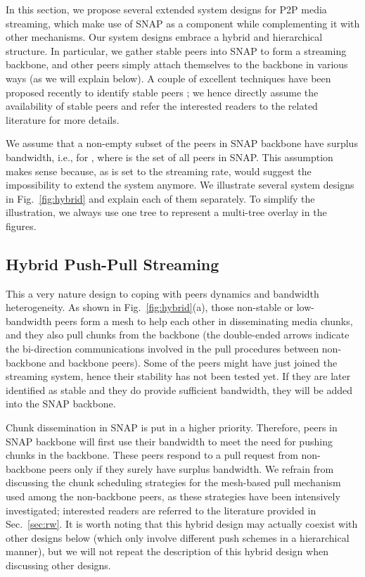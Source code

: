\documentclass[conference]{IEEEtran}
\begin{document}
  In this section, we propose several extended system designs for P2P media streaming, which make use of SNAP as a component while complementing it with other mechanisms. Our system designs embrace a hybrid and hierarchical structure. In particular, we gather stable peers into SNAP to form a streaming backbone, and other peers simply attach themselves to the backbone in various ways (as we will explain below). A couple of excellent techniques have been proposed recently to identify stable peers \cite{WangLX-INFOCOM08,LiuWLZ-INFOCOM09}; we hence directly assume the availability of stable peers and refer the interested readers to the related literature for more details.

  We assume that a non-empty subset of the peers in SNAP backbone have surplus bandwidth, i.e.,  for , where  is the set of all peers in SNAP. This assumption makes sense because, as  is set to the streaming rate,  would suggest the impossibility to extend the system anymore. We illustrate several system designs in Fig.~\ref{fig:hybrid} and explain each of them separately. To simplify the illustration, we always use one tree to represent a multi-tree overlay in the figures.
  

\subsection{Hybrid Push-Pull Streaming}
  This a very nature design to coping with peers dynamics and bandwidth heterogeneity. As shown in Fig.~\ref{fig:hybrid}(a), those non-stable or low-bandwidth peers form a mesh to help each other in disseminating media chunks, and they also pull chunks from the backbone (the double-ended arrows indicate the bi-direction communications involved in the pull procedures between non-backbone and backbone peers). Some of the peers might have just joined the streaming system, hence their stability has not been tested yet. If they are later identified as stable and they do provide sufficient bandwidth, they will be added into the SNAP backbone.

  Chunk dissemination in SNAP is put in a higher priority. Therefore, peers in SNAP backbone will first use their bandwidth to meet the need for pushing chunks in the backbone. These peers respond to a pull request from non-backbone peers only if they surely have surplus bandwidth. We refrain from discussing the chunk scheduling strategies for the mesh-based pull mechanism used among the non-backbone peers, as these strategies have been intensively investigated; interested readers are referred to the literature provided in Sec.~\ref{sec:rw}. It is worth noting that this hybrid design may actually coexist with other designs below (which only involve different push schemes in a hierarchical manner), but we will not repeat the description of this hybrid design when discussing other designs.
\end{document}
